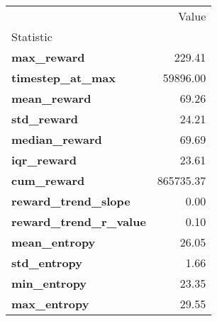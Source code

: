 \begin{tabular}{lr}
\toprule
 & Value \\
Statistic &  \\
\midrule
\textbf{max\_reward} & 229.41 \\
\textbf{timestep\_at\_max} & 59896.00 \\
\textbf{mean\_reward} & 69.26 \\
\textbf{std\_reward} & 24.21 \\
\textbf{median\_reward} & 69.69 \\
\textbf{iqr\_reward} & 23.61 \\
\textbf{cum\_reward} & 865735.37 \\
\textbf{reward\_trend\_slope} & 0.00 \\
\textbf{reward\_trend\_r\_value} & 0.10 \\
\textbf{mean\_entropy} & 26.05 \\
\textbf{std\_entropy} & 1.66 \\
\textbf{min\_entropy} & 23.35 \\
\textbf{max\_entropy} & 29.55 \\
\bottomrule
\end{tabular}
